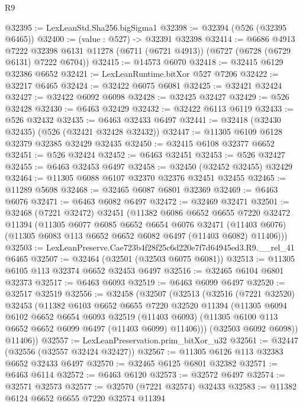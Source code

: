 \begin{lexlean}{R9}
\begin{coremodule}
@32395 := LexLeanStd.Sha256.bigSigma1
@32398 := @32394 (@526 (@32395 @6465))
@32400 := (value : @527) -> @32391 @32398
@32414 := @6686
    @4913
    @7222
    @32398
    @6131
    @11278
    (@6711 (@6721 @4913))
    (@6727 (@6728 (@6729 @6131) @7222 @6704))
@32415 := @14573 @6070
@32418 := @32415 @6129 @32386 @6652
@32421 := LexLeanRuntime.bitXor @527 @7206
@32422 := @32217 @6465
@32424 := @32422 @6075 @6081
@32425 := @32421 @32424
@32427 := @32422 @6092 @6098
@32428 := @32425 @32427
@32429 := @526 @32428
@32430 := @6463 @32429
@32432 := @32422 @6113 @6119
@32433 := @526 @32432
@32435 := @6463 @32433 @6497
@32441 := @32418 (@32430 @32435) (@526 (@32421 @32428 @32432))
@32447 := @11305 @6109 @6128 @32379 @32385 @32429 @32435
@32450 := @32415 @6108 @32377 @6652
@32451 := @526 @32424
@32452 := @6463 @32451
@32453 := @526 @32427
@32455 := @6463 @32453 @6497
@32458 := @32450 (@32452 @32455) @32429
@32464 := @11305 @6088 @6107 @32370 @32376 @32451 @32455
@32465 := @11289 @5698
@32468 := @32465 @6087 @6801 @32369
@32469 := @6463 @6076
@32471 := @6463 @6082 @6497
@32472 := @32469 @32471
@32501 := @32468
    (@7221 @32472)
    @32451
    (@11382
      @6086
      @6652
      @6655
      @7220
      @32472
      @11394
      (@11305
        @6077
        @6085
        @6652
        @6654
        @6076
        @32471
        (@11403 @6076)
        (@11305 @6083 @113 @6652 @6652 @6082 @6497 (@11403 @6082) @11406)))
@32503 := LexLeanPreserve.Cae723b4f28f25c6d220e7f7d64945ed3.R9.__rel_41 @6465
@32507 := @32464 (@32501 (@32503 @6075 @6081))
@32513 := @11305 @6105 @113 @32374 @6652 @32453 @6497
@32516 := @32465 @6104 @6801 @32373
@32517 := @6463 @6093
@32519 := @6463 @6099 @6497
@32520 := @32517 @32519
@32556 := @32458
    (@32507
      (@32513
        (@32516
          (@7221 @32520)
          @32453
          (@11382
            @6103
            @6652
            @6655
            @7220
            @32520
            @11394
            (@11305
              @6094
              @6102
              @6652
              @6654
              @6093
              @32519
              (@11403 @6093)
              (@11305 @6100 @113 @6652 @6652 @6099 @6497 (@11403 @6099) @11406)))
          (@32503 @6092 @6098))
        @11406))
@32557 := LexLeanPreservation.prim_bitXor_u32
@32561 := @32447 (@32556 (@32557 @32424 @32427))
@32567 := @11305 @6126 @113 @32383 @6652 @32433 @6497
@32570 := @32465 @6125 @6801 @32382
@32571 := @6463 @6114
@32572 := @6463 @6120
@32573 := @32572 @6497
@32574 := @32571 @32573
@32577 := @32570 (@7221 @32574) @32433
@32583 := @11382 @6124 @6652 @6655 @7220 @32574 @11394

\end{coremodule}
\end{lexlean}
